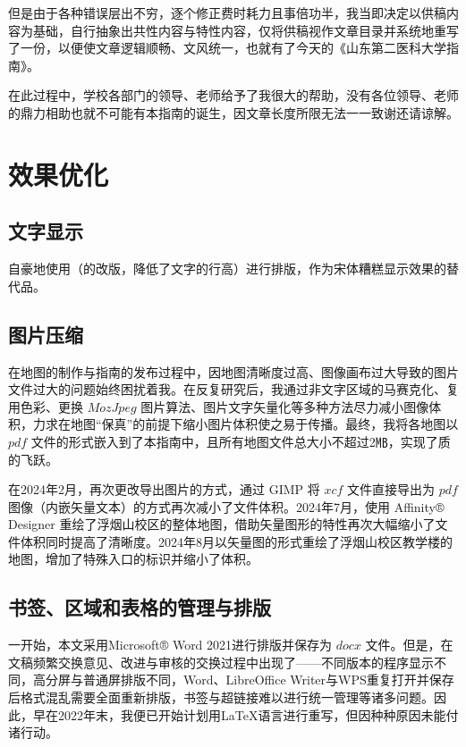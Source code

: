 但是由于各种错误层出不穷，逐个修正费时耗力且事倍功半，我当即决定以供稿内容为基础，自行抽象出共性内容与特性内容，仅将供稿视作文章目录并系统地重写了一份，以便使文章逻辑顺畅、文风统一，也就有了今天的《山东第二医科大学指南》。

在此过程中，学校各部门的领导、老师给予了我很大的帮助，没有各位领导、老师的鼎力相助也就不可能有本指南的诞生，因文章长度所限无法一一致谢还请谅解。

\section[效果优化]{效果优化}
\subsection[文字显示]{文字显示}
自豪地使用（的改版，降低了文字的行高）进行排版，作为宋体糟糕显示效果的替代品。

\subsection[图片压缩]{图片压缩}
在地图的制作与指南的发布过程中，因地图清晰度过高、图像画布过大导致的图片文件过大\footnotemark 的问题始终困扰着我。在反复研究后，我通过非文字区域的马赛克化、复用色彩、更换 $MozJpeg$ 图片算法、图片文字矢量化等多种方法尽力减小图像体积，力求在地图“保真”的前提下缩小图片体积使之易于传播。最终，我将各地图以 $pdf$ 文件的形式嵌入到了本指南中，且所有地图文件总大小不超过2㎆，实现了质的飞跃。

在2024年2月，再次更改导出图片的方式，通过 GIMP 将 $xcf$ 文件直接导出为 $pdf$ 图像（内嵌矢量文本）的方式再次减小了文件体积。2024年7月，使用 Affinity® Designer 重绘了浮烟山校区的整体地图，借助矢量图形的特性再次大幅缩小了文件体积同时提高了清晰度。2024年8月以矢量图的形式重绘了浮烟山校区教学楼的地图，增加了特殊入口的标识并缩小了体积。

\subsection[书签、区域和表格的管理与排版]{书签、区域和表格的管理与排版}
一开始，本文采用Microsoft® Word 2021进行排版并保存为 $docx$ 文件。但是，在文稿频繁交换意见、改进与审核的交换过程中出现了——不同版本的程序显示不同，高分屏与普通屏排版不同，Word、LibreOffice Writer与WPS重复打开并保存后格式混乱需要全面重新排版，书签与超链接难以进行统一管理等诸多问题。因此，早在2022年末，我便已开始计划用\LaTeX 语言进行重写，但因种种原因未能付诸行动。


